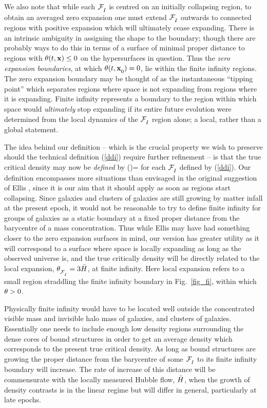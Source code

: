 \documentclass[12pt]{article}
\begin{document}
We also note that while each $\FI$ is centred on an initially collapsing
region, to obtain an averaged zero expansion one must extend $\FI$
outwards to connected regions with positive expansion which will ultimately
cease expanding. There is an intrinsic ambiguity in assigning the shape
to the boundary; though there are probably ways to do this in terms of
a surface of minimal proper distance to regions with $\theta(t,{\mathbf x})\le0$
on the hypersurfaces in question. Thus the {\em zero expansion boundaries},
at which $\th(t,\bx\Z0)=0$, lie within the finite infinity regions. The
zero expansion boundary may be thought of as the instantaneous
``tipping point'' which separates regions where space is not expanding
from regions where it is expanding. Finite infinity represents a boundary
to the region within which space would {\em ultimately} stop expanding if its
entire future evolution were determined from the local dynamics of
the $\FI$ region alone; a local, rather than a global statement.

The idea behind our definition -- which is the crucial property we wish
to preserve should the technical definition (\ref{ddi}) require further
refinement -- is that the true critical density may now be {\em defined} by
\beq
\rhcr(\tc)=\ave{\rh(\tc,\bx)}\Z{\Fi}
\label{truecr}\eeq
for each $\FI$ defined by (\ref{ddi}). Our definition encompasses more
situations than envisaged in the original suggestion of Ellis \cite{fit1},
since it is our aim that it should apply as soon as regions start collapsing.
Since galaxies and clusters of galaxies are still growing by matter infall
at the present epoch, it would not be reasonable to try to define finite
infinity for groups of galaxies as a static boundary at a fixed proper
distance from the barycentre of a mass concentration. Thus while Ellis
may have had something closer to the zero expansion surfaces in mind,
our version has greater utility as it will correspond to a surface where
space is locally expanding as long as the observed universe is, and the
true critically density will be directly related to the local expansion,
$\th\Z{\Fi}=3\bH$, at finite infinity. Here local expansion refers to a
small region straddling the finite infinity boundary in Fig.~\ref{fig_fi},
within which $\theta>0$.

Physically finite infinity would have to be located well outside the
concentrated visible mass and invisible halo mass of galaxies, and clusters
of galaxies. Essentially one needs to include enough low density regions
surrounding the dense cores of bound structures in order to get
an average density which corresponds to the present true critical density.
As long as bound structures are growing the proper distance from the
barycentre of some $\FI$ to its finite infinity boundary will increase.
The rate of increase of this distance will be commensurate with the locally
measured Hubble flow, $\bH$, when the growth of density contrasts is in the
linear regime but will differ in general, particularly at late epochs.
\end{document}
